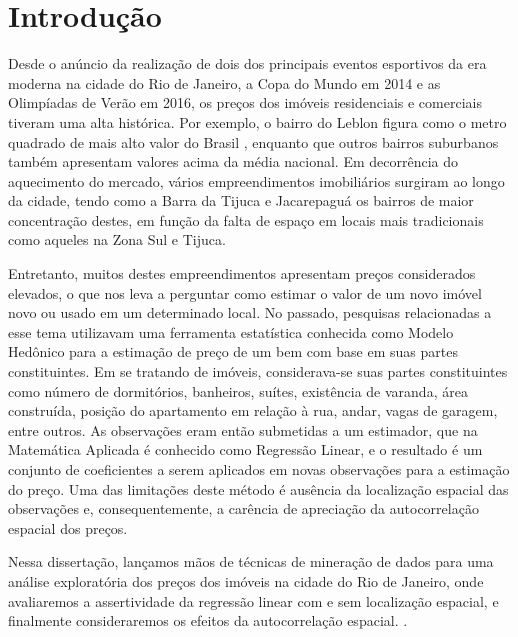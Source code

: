 \cleardoublepage

\pagestyle{fancy}


\chapter{Introdução}\label{intro}

Desde o anúncio da realização de dois dos principais eventos esportivos da era moderna na cidade do Rio de Janeiro, a Copa do Mundo em 2014 e as Olimpíadas de Verão em 2016, os preços dos imóveis residenciais e comerciais tiveram uma alta histórica. Por exemplo, o bairro do Leblon figura como o metro quadrado de mais alto valor do Brasil , enquanto que outros bairros suburbanos também apresentam valores acima da média nacional. Em decorrência do aquecimento do mercado, vários empreendimentos imobiliários surgiram ao longo da cidade, tendo como a Barra da Tijuca e Jacarepaguá os bairros de maior concentração destes, em função da falta de espaço em locais mais tradicionais como aqueles na Zona Sul e Tijuca.

Entretanto, muitos destes empreendimentos apresentam preços considerados elevados, o que nos leva a perguntar como estimar o valor de um novo imóvel novo ou usado em um determinado local. No passado, pesquisas relacionadas a esse tema utilizavam uma ferramenta estatística conhecida como Modelo Hedônico  para a estimação de preço de um bem com base em suas partes constituintes. Em se tratando de imóveis, considerava-se suas partes constituintes como número de dormitórios, banheiros, suítes, existência de varanda, área construída, posição do apartamento em relação à rua, andar, vagas de garagem, entre outros. As observações eram então submetidas a um estimador, que na Matemática Aplicada é conhecido como Regressão Linear, e o resultado é um conjunto de coeficientes a serem aplicados em novas observações para a estimação do preço. Uma das limitações deste método é ausência da localização espacial das observações e, consequentemente, a carência de apreciação da autocorrelação espacial dos preços.

Nessa dissertação, lançamos mãos de técnicas de mineração de dados para uma análise exploratória dos preços dos imóveis na cidade do Rio de Janeiro, onde avaliaremos a assertividade da regressão linear com e sem localização espacial, e finalmente consideraremos os efeitos da autocorrelação espacial.   . 

